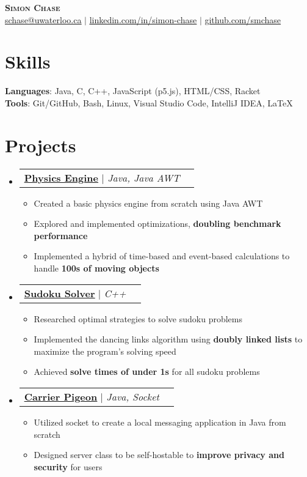 \documentclass[letterpaper,11pt]{article}
\makeatletter
\newcommand{\resumeItem}[1]{
	\item\small{
		{#1 \vspace{-2pt}}
	}
}
\newcommand{\resumeProjectHeading}[2]{
    \item
    \begin{tabular*}{0.97\textwidth}{l@{\extracolsep{\fill}}r}
      \small#1 & #2 \\
    \end{tabular*}\vspace{-7pt}
}
\newcommand{\resumeSubHeadingListStart}{\begin{itemize}[leftmargin=0.15in, label={}]}
\newcommand{\resumeSubHeadingListEnd}{\end{itemize}}
\newcommand{\resumeItemListStart}{\begin{itemize}}
\newcommand{\resumeItemListEnd}{\end{itemize}\vspace{-5pt}}
\makeatother
\begin{document}
\begin{center}
    \textbf{\Huge \scshape Simon Chase} \\ \vspace{1pt}
    \small
	\href{mailto:schase@uwaterloo.ca}{\uline{schase@uwaterloo.ca}} $|$ 
    \href{https://linkedin.com/in/simon-chase}{\uline{linkedin.com/in/simon-chase}} $|$
    \href{https://github.com/smchase}{\uline{github.com/smchase}}
\end{center}


\section{Skills}
\begin{itemize}[leftmargin=0.15in, label={}]
\small{\item{
	\textbf{Languages}{: Java, C, C++, JavaScript (p5.js), HTML/CSS, Racket} \\
	\textbf{Tools}{: Git/GitHub, Bash, Linux, Visual Studio Code, IntelliJ IDEA, \LaTeX}
}}
\end{itemize}


\section{Projects}
\resumeSubHeadingListStart
	\resumeProjectHeading
	{\textbf{\href{https://github.com/Bro-Co/Physics-Engine}{\uline{Physics Engine}}} $|$ \textit{Java, Java AWT}}{} \resumeItemListStart
			\resumeItem{Created a basic physics engine from scratch using Java AWT}
			\resumeItem{Explored and implemented optimizations, \textbf{doubling benchmark performance}}
			\resumeItem{Implemented a hybrid of time-based and event-based calculations to handle \textbf{100s of moving objects}}
		\resumeItemListEnd
	\resumeProjectHeading
		{\textbf{\href{https://github.com/smchase/ICS201/tree/master/SUDOKU}{\uline{Sudoku Solver}}} $|$ \textit{C++}}{}
		\resumeItemListStart
			\resumeItem{Researched optimal strategies to solve sudoku problems}
			\resumeItem{Implemented the dancing links algorithm using \textbf{doubly linked lists} to maximize the program's solving speed}
			\resumeItem{Achieved \textbf{solve times of under 1s} for all sudoku problems}
		\resumeItemListEnd
	\resumeProjectHeading
		{\textbf{\href{https://github.com/smchase/Carrier-Pigeon}{\uline{Carrier Pigeon}}} $|$ \textit{Java, Socket}}{}
		\resumeItemListStart
			\resumeItem{Utilized socket to create a local messaging application in Java from scratch}
			\resumeItem{Designed server class to be self-hostable to \textbf{improve privacy and security} for users}
		\resumeItemListEnd
\resumeSubHeadingListEnd
\end{document}
